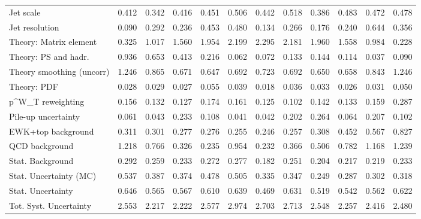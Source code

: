 \begin{tabular}{l|p{0.6cm}p{0.6cm}p{0.6cm}p{0.6cm}p{0.6cm}p{0.6cm}p{0.6cm}p{0.6cm}p{0.6cm}p{0.6cm}p{0.6cm}}
Jet scale                                & 0.412 & 0.342 & 0.416 & 0.451 & 0.506 & 0.442 & 0.518 & 0.386 & 0.483 & 0.472 & 0.478 \\
Jet resolution                           & 0.090 & 0.292 & 0.236 & 0.453 & 0.480 & 0.134 & 0.266 & 0.176 & 0.240 & 0.644 & 0.356 \\
Theory: Matrix element                   & 0.325 & 1.017 & 1.560 & 1.954 & 2.199 & 2.295 & 2.181 & 1.960 & 1.558 & 0.984 & 0.228 \\
Theory: PS and hadr.                     & 0.936 & 0.653 & 0.413 & 0.216 & 0.062 & 0.072 & 0.133 & 0.144 & 0.114 & 0.037 & 0.090 \\
Theory smoothing (uncorr)                & 1.246 & 0.865 & 0.671 & 0.647 & 0.692 & 0.723 & 0.692 & 0.650 & 0.658 & 0.843 & 1.246 \\
Theory: PDF                              & 0.028 & 0.029 & 0.027 & 0.055 & 0.039 & 0.018 & 0.036 & 0.033 & 0.026 & 0.031 & 0.050 \\
p^{W}_{T} reweighting                    & 0.156 & 0.132 & 0.127 & 0.174 & 0.161 & 0.125 & 0.102 & 0.142 & 0.133 & 0.159 & 0.287 \\
Pile-up uncertainty                      & 0.061 & 0.043 & 0.233 & 0.108 & 0.041 & 0.042 & 0.202 & 0.264 & 0.064 & 0.207 & 0.102 \\
EWK+top background                       & 0.311 & 0.301 & 0.277 & 0.276 & 0.255 & 0.246 & 0.257 & 0.308 & 0.452 & 0.567 & 0.827 \\
QCD background                           & 1.218 & 0.766 & 0.326 & 0.235 & 0.954 & 0.232 & 0.366 & 0.506 & 0.782 & 1.168 & 1.239 \\
Stat. Background                         & 0.292 & 0.259 & 0.233 & 0.272 & 0.277 & 0.182 & 0.251 & 0.204 & 0.217 & 0.219 & 0.233 \\
Stat. Uncertainty (MC)                   & 0.537 & 0.387 & 0.374 & 0.478 & 0.505 & 0.335 & 0.347 & 0.249 & 0.287 & 0.302 & 0.318 \\
\hline
Stat. Uncertainty                        & 0.646 & 0.565 & 0.567 & 0.610 & 0.639 & 0.469 & 0.631 & 0.519 & 0.542 & 0.562 & 0.622 \\
\hline
Tot. Syst. Uncertainty                   & 2.553 & 2.217 & 2.222 & 2.577 & 2.974 & 2.703 & 2.713 & 2.548 & 2.257 & 2.416 & 2.480 \\
\hline
\end{tabular}
